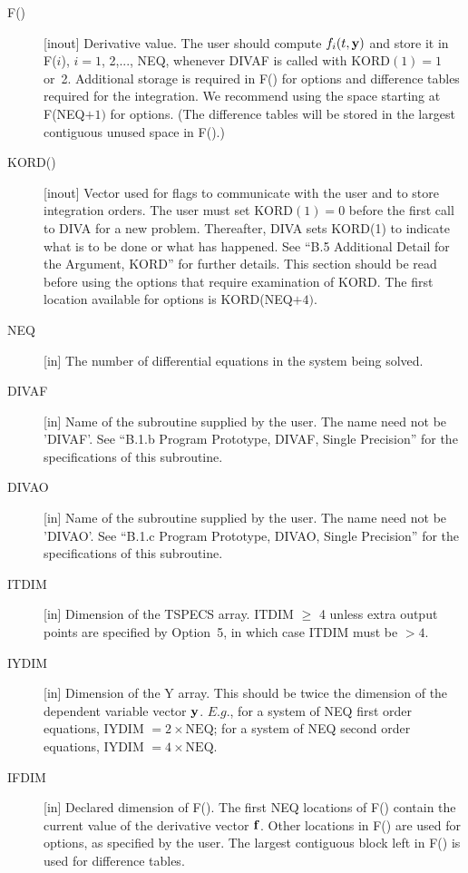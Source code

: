 \documentclass[twoside]{MATH77}
\begin{document}
\begin{description}
\item[F()]  [inout] Derivative value. The user should compute $f_i(t,{\bf y}%
) $ and store it in F($i$), $i=1$, 2,..., NEQ, whenever DIVAF is called with
KORD$(1)=1$ or~2. Additional storage is required in F() for options and
difference tables required for the integration. We recommend using the
space starting at F(NEQ$+1)$ for options. (The difference
tables will be stored in the largest contiguous unused space in F().)

\item[KORD()] [inout] Vector used for flags to communicate with the user and
  to store integration orders. The user must set KORD$(1)=0$ before the first
  call to DIVA for a new problem. Thereafter, DIVA sets KORD(1) to indicate
  what is to be done or what has happened. See ``B.5 Additional Detail for the
  Argument, KORD'' for further details. This section should be read before
  using the options that require examination of KORD.  The first location
  available for options is KORD(NEQ$+4).$

\item[NEQ]  [in] The number of differential equations in the system being
solved.

\item[DIVAF]  [in] Name of the subroutine supplied by the user. The name
need not be 'DIVAF'. See ``B.1.b Program Prototype, DIVAF, Single
Precision'' for the specifications of this subroutine.

\item[DIVAO]  [in] Name of the subroutine supplied by the user. The name
need not be 'DIVAO'. See ``B.1.c Program Prototype, DIVAO, Single
Precision'' for the specifications of this subroutine.

\item[ITDIM]  [in] Dimension of the TSPECS array. ITDIM $\geq $ 4 unless extra
output points are specified by Option~5, in which case ITDIM must be $ > 4.$

\item[IYDIM]  [in] Dimension of the Y array. This should be twice the
dimension of the dependent variable vector ${\bf y}$. $E.g.$, for a system
of NEQ first order equations, IYDIM $=2\times \text{NEQ}$; for a system
of NEQ second order equations, IYDIM $= 4\times \text{NEQ}.$

\item[IFDIM]  [in] Declared dimension of F(). The first NEQ locations of F()
contain the current value of the derivative vector ${\bf f}$.
Other locations in F() are used for options, as specified by the user. The
largest contiguous block left in F() is used for difference tables.


\end{description}
\end{document}
